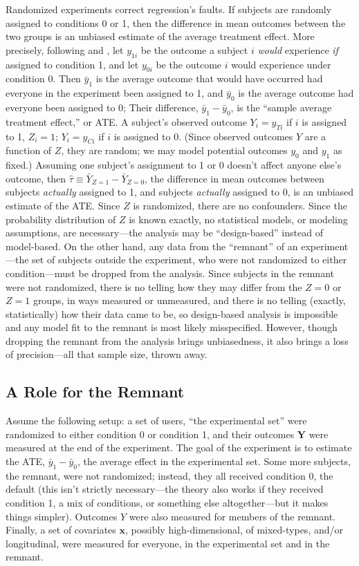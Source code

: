 \documentclass{edm_template}
\newcommand{\yti}{y_{Ti}}
\newcommand{\yci}{y_{Ci}}
\newcommand{\tauhat}{\hat{\tau}}
\begin{document}
Randomized experiments correct regression's faults. 
If subjects are randomly assigned to conditions 0 or 1, then the difference in mean outcomes between the two groups is an unbiased estimate of the average treatment effect.
More precisely, following \cite{neyman} and \cite{rubin}, let $y_{1i}$ be the outcome a subject $i$ \emph{would} experience \emph{if} assigned to condition 1, and let $y_{0i}$ be the outcome $i$ would experience under condition 0.
Then $\bar{y}_1$ is the average outcome that would have occurred had everyone in the experiment been assigned to 1, and $\bar{y}_0$ is the average outcome had everyone been assigned to 0; Their difference, $\bar{y}_1-\bar{y}_0$, is the ``sample average treatment effect,'' or ATE.
A subject's observed outcome $Y_i=\yti$ if $i$ is assigned to 1, $Z_i=1$; $Y_i=\yci$ if $i$ is assigned to 0. 
(Since observed outcomes $Y$ are a function of $Z$, they are random; we may model potential outcomes $y_0$ and $y_1$ as fixed.)
Assuming one subject's assignment to 1 or 0 doesn't affect anyone else's outcome, then $\tauhat\equiv\bar{Y}_{Z=1}-\bar{Y}_{Z=0}$, the difference in mean outcomes between subjects \emph{actually} assigned to 1, and subjects \emph{actually} assigned to 0, is an unbiased estimate of the ATE.
Since $Z$ is randomized, there are no confounders. 
Since the probability distribution of $Z$ is known exactly, no statistical models, or modeling assumptions, are necessary---the analysis may be ``design-based'' instead of model-based.  
On the other hand, any data from the ``remnant'' of an experiment---the set of subjects outside the experiment, who were not randomized to either condition---must be dropped from the analysis. 
Since subjects in the remnant were not randomized, there is no telling how they may differ from the $Z=0$ or $Z=1$ groups, in ways measured or unmeasured, and there is no telling (exactly, statistically) how their data came to be, so design-based analysis is impossible and any model fit to the remnant is most likely misspecified. 
However, though dropping the remnant from the analysis brings unbiasedness, it also brings a loss of precision---all that sample size, thrown away. 

\subsection{A Role for the Remnant} 
Assume the following setup:
a set of users, ``the experimental set'' were randomized to either condition 0 or condition 1, and their outcomes $\bm{Y}$ were measured at the end of the experiment.
The goal of the experiment is to estimate the ATE, $\bar{y}_1-\bar{y}_0$, the average effect in the experimental set. 
Some more subjects, the remnant, were not randomized; instead, they all received condition 0, the default (this isn't strictly necessary---the theory also works if they received condition 1, a mix of conditions, or something else altogether---but it makes things simpler). 
Outcomes $Y$ were also measured for members of the remnant.
Finally, a set of covariates $\bm{x}$, possibly high-dimensional, of mixed-types, and/or longitudinal, were measured for everyone, in the experimental set and in the remnant. 
\end{document}
